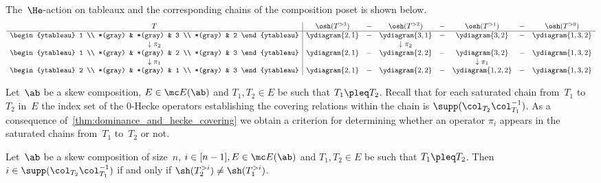  \begin{exam} 
 	The~$\He$-action on tableaux and the corresponding chains of the composition poset is shown below.
 	\begin{align*}
 	\begin{array}{c|ccccccc}
 	T & \osh(T^{>3}) &-& \osh(T^{>2}) &-& \osh(T^{>1}) &-& \osh(T^{>0})\\ \hline
 	\begin{ytableau}
 	1 \\
 	*(gray) & *(gray) & 3 \\
 	*(gray) & 2
 	\end{ytableau}
 	& \ydiagram{2,1} 
 	&-& \ydiagram{3,1} 
 	&-& \ydiagram{3,2} 
 	&-& \ydiagram{1,3,2} \\
 	\downarrow \pi_2 &&& \downarrow \pi_2 
 	\\
 	\begin{ytableau}
 	1 \\
 	*(gray) & *(gray) & 2 \\
 	*(gray) & 3
 	\end{ytableau}
 	& \ydiagram{2,1} 
 	&-& \ydiagram{2,2} 
 	&-& \ydiagram{3,2} 
 	&-& \ydiagram{1,3,2} \\
 	\downarrow \pi_1 &&&&& \downarrow \pi_1
 	\\
 	\begin{ytableau}
 	2 \\
 	*(gray) & *(gray) & 1 \\
 	*(gray) & 3
 	\end{ytableau}
 	& \ydiagram{2,1} 
 	&-& \ydiagram{2,2} 
 	&-& \ydiagram{1,2,2} 
 	&-& \ydiagram{1,3,2} \\	
 	\end{array}
 	\end{align*}
 \end{exam}
Let~$\ab$ be a skew composition, $E\in \mc E(\ab)$ and $T_1,T_2 \in E$ be such that $T_1\pleq T_2$.
Recall that for each saturated chain from~$T_1$ to~$T_2$ in~$E$ the index set of the 0-Hecke operators establishing the covering relations within the chain is $\supp(\col_{T_2}\col^{-1}_{T_1})$.
As a consequence of~\cref{thm:dominance_and_hecke_covering} we obtain a criterion for determining whether an operator $\pi_i$ appears in the saturated chains from~$T_1$ to~$T_2$ or not.

\begin{prop}
	\label{thm:support_of_column_word_and_shape}
	Let~$\ab$ be a skew composition of size~$n$, $i\in [n-1], E\in \mc E(\ab)$ and $T_1,T_2\in E$ be such that $T_1\pleq T_2$. 
	Then
	$i\in \supp(\col_{T_2}\col^{-1}_{T_1})$
	if and only if
	$\sh(T_2^{>i}) \neq \sh(T_1^{>i})$.
\end{prop}

